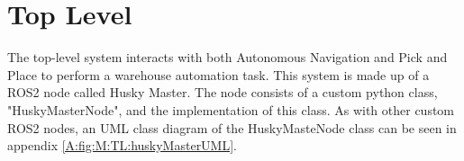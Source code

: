 

\FloatBarrier
\section{Top Level} \label{sec:M:TopLevel}

The top-level system interacts with both Autonomous Navigation and Pick and Place to perform a warehouse automation task. This system is made up of a ROS2 node called Husky Master. The node consists of a custom python class, "HuskyMasterNode", and the implementation of this class. As with other custom ROS2 nodes, an UML class diagram of the HuskyMasteNode class can be seen in appendix \ref{A:fig:M:TL:huskyMasterUML}.

